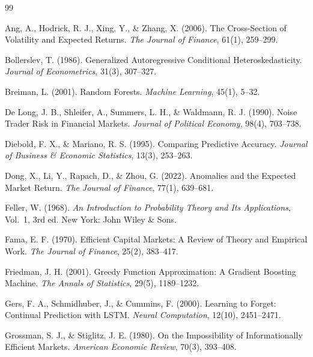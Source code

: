 ﻿\documentclass[11pt,a4paper]{article}
\begin{document}
\begin{thebibliography}{99}

Ang, A., Hodrick, R. J., Xing, Y., \& Zhang, X. (2006).
\newblock The Cross-Section of Volatility and Expected Returns.
\newblock \textit{The Journal of Finance}, 61(1), 259--299.

Bollerslev, T. (1986).
\newblock Generalized Autoregressive Conditional Heteroskedasticity.
\newblock \textit{Journal of Econometrics}, 31(3), 307--327.

Breiman, L. (2001).
\newblock Random Forests.
\newblock \textit{Machine Learning}, 45(1), 5--32.

De Long, J. B., Shleifer, A., Summers, L. H., \& Waldmann, R. J. (1990).
\newblock Noise Trader Risk in Financial Markets.
\newblock \textit{Journal of Political Economy}, 98(4), 703--738.

Diebold, F. X., \& Mariano, R. S. (1995).
\newblock Comparing Predictive Accuracy.
\newblock \textit{Journal of Business \& Economic Statistics}, 13(3), 253--263.

Dong, X., Li, Y., Rapach, D., \& Zhou, G. (2022).
\newblock Anomalies and the Expected Market Return.
\newblock \textit{The Journal of Finance}, 77(1), 639--681.

Feller, W. (1968).
\newblock \textit{An Introduction to Probability Theory and Its Applications}, Vol.~1, 3rd ed.
\newblock New York: John Wiley \& Sons.

Fama, E. F. (1970).
\newblock Efficient Capital Markets: A Review of Theory and Empirical Work.
\newblock \textit{The Journal of Finance}, 25(2), 383--417.

Friedman, J. H. (2001).
\newblock Greedy Function Approximation: A Gradient Boosting Machine.
\newblock \textit{The Annals of Statistics}, 29(5), 1189--1232.

Gers, F. A., Schmidhuber, J., \& Cummins, F. (2000).
\newblock Learning to Forget: Continual Prediction with LSTM.
\newblock \textit{Neural Computation}, 12(10), 2451--2471.

Grossman, S. J., \& Stiglitz, J. E. (1980).
\newblock On the Impossibility of Informationally Efficient Markets.
\newblock \textit{American Economic Review}, 70(3), 393--408.


\end{thebibliography}
\end{document}
